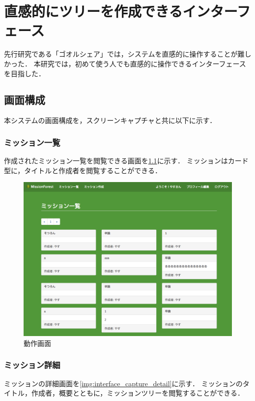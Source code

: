 \chapter{直感的にツリーを作成できるインターフェース}
先行研究である「ゴオルシェア」では，システムを直感的に操作することが難しかった．
本研究では，初めて使う人でも直感的に操作できるインターフェースを目指した．

\section{画面構成}
本システムの画面構成を，スクリーンキャプチャと共に以下に示す．

\subsection{ミッション一覧}
作成されたミッション一覧を閲覧できる画面を\ref{img:interface_capture_list}に示す．
ミッションはカード型に，タイトルと作成者を閲覧することができる．

\begin{figure}[t]
	\begin{center}
		\includegraphics[width=0.9\linewidth]{assets/img/interface_capture_list.png}
		\caption{動作画面}
		\label{img:interface_capture_list}
	\end{center}
\end{figure}

\subsection{ミッション詳細}
ミッションの詳細画面を\ref{img:interface_capture_detail}に示す．
ミッションのタイトル，作成者，概要とともに，ミッションツリーを閲覧することができる．

